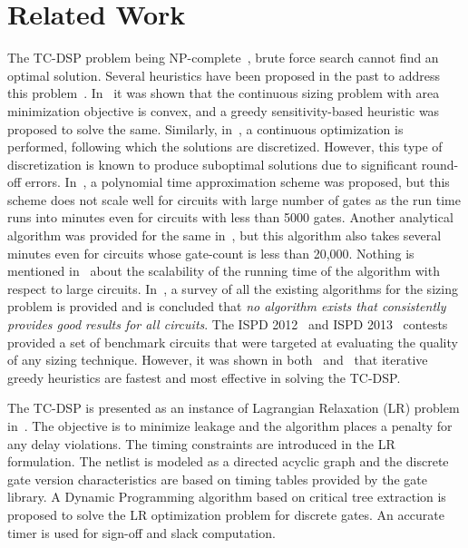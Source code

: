 \section{Related Work}
\label{sec:related-work}
\noindent The TC-DSP problem being NP-complete~\cite{feng:09}, brute force search cannot find an optimal solution. Several heuristics have been proposed in the past to address this problem~\cite{feng:09,wu:08,fishburn:85,sundarajan:99,liu:10,hu:12, mok:12,coudert:97}. 
In~\cite{fishburn:85} it was shown that the continuous sizing problem 
with area minimization objective is convex, and a greedy sensitivity-based 
heuristic was proposed to solve the same. Similarly, in~\cite{sundarajan:99}, 
a continuous optimization is performed, following which the solutions are 
discretized. However, this type of discretization is known to produce 
suboptimal solutions due to significant round-off errors. In~\cite{feng:09}, 
a polynomial time approximation scheme was proposed, but this scheme does not 
scale well for circuits with large number of gates as the run time runs into minutes even for circuits with less than 5000 gates. Another analytical algorithm was provided for the same 
in~\cite{liu:10}, but this algorithm also takes several minutes even for 
circuits whose gate-count is less than 20,000. Nothing is mentioned in~\cite{liu:10} about the scalability of the running time of the algorithm with respect to large circuits. In~\cite{mok:12}, a survey 
of all the existing algorithms for the sizing problem is provided and is concluded 
that {\em no algorithm exists that consistently provides good results for all circuits}. The ISPD 2012~\cite{ispdcontest1} and ISPD 2013~\cite{ispdcontest2} contests provided a set of benchmark circuits that were targeted at evaluating the quality of any sizing technique. 
However, it was shown in both~\cite{hu:12} and~\cite{mok:12} that iterative 
greedy heuristics are fastest and most effective in solving the TC-DSP. 

The TC-DSP is presented as an instance of Lagrangian Relaxation (LR) problem in~\cite{Hu:11}. The objective is to minimize leakage and the algorithm places a penalty for any delay violations. The timing constraints are introduced in the LR formulation.  The netlist is modeled as a directed acyclic graph and the discrete gate version characteristics are based
on timing tables provided by the gate library. A Dynamic Programming algorithm
based on critical tree extraction is proposed to solve the LR optimization problem for discrete gates. An accurate timer is used for sign-off and slack computation.
 
